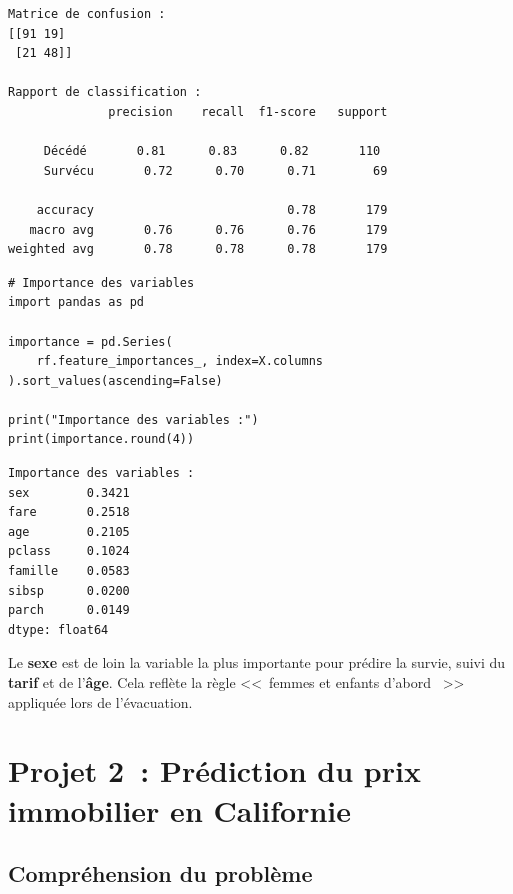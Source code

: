 \begin{codeoutput}
\begin{verbatim}
Matrice de confusion :
[[91 19]
 [21 48]]

Rapport de classification :
              precision    recall  f1-score   support

     Décédé       0.81      0.83      0.82       110
     Survécu       0.72      0.70      0.71        69

    accuracy                           0.78       179
   macro avg       0.76      0.76      0.76       179
weighted avg       0.78      0.78      0.78       179
\end{verbatim}
\end{codeoutput}

\begin{codeblock}[title=\textbf{Python}]
\begin{verbatim}
# Importance des variables
import pandas as pd

importance = pd.Series(
    rf.feature_importances_, index=X.columns
).sort_values(ascending=False)

print("Importance des variables :")
print(importance.round(4))
\end{verbatim}
\end{codeblock}

\begin{codeoutput}
\begin{verbatim}
Importance des variables :
sex        0.3421
fare       0.2518
age        0.2105
pclass     0.1024
famille    0.0583
sibsp      0.0200
parch      0.0149
dtype: float64
\end{verbatim}
\end{codeoutput}

\begin{remarque}
Le \textbf{sexe} est de loin la variable la plus importante pour pr\'edire la survie, suivi du \textbf{tarif} et de l'\textbf{\^age}. Cela refl\`ete la r\`egle <<~femmes et enfants d'abord ~>> appliqu\'ee lors de l'\'evacuation.
\end{remarque}

\section{Projet 2~: Pr\'ediction du prix immobilier en Californie}
\label{sec:projet_california}


\subsection{Compr\'ehension du probl\`eme}

